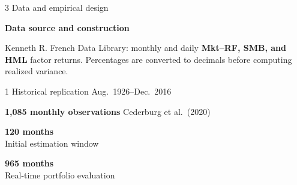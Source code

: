 \documentclass[aspectratio=169,10pt]{beamer}
\newcommand{\micro}[1]{{\color{forest}\bfseries\small #1}}
\begin{document}
\begin{frame}{3 \quad Data and empirical design}



\micro{Data source and construction}

\vspace{.04cm}

{\small
Kenneth R. French Data Library:
monthly and daily \textbf{Mkt--RF, SMB, and HML}
factor returns. Percentages are converted to decimals
before computing realized variance.
}

\vspace{.04cm}


\begin{block}{
  1 \quad Historical replication
  \hfill
  \small Aug.\ 1926--Dec.\ 2016
}

\small
\textbf{1,085 monthly observations}
\hfill
{\scriptsize Cederburg et al.\ (2020)}

\vspace{.04cm}


\vspace{.04cm}

\begin{minipage}[t]{.35\linewidth}
{\scriptsize
\textbf{120 months}\\
Initial estimation window
}
\end{minipage}
\hfill
\begin{minipage}[t]{.60\linewidth}
\raggedleft
{\scriptsize
\textbf{965 months}\\
Real-time portfolio evaluation
}
\end{minipage}

\end{block}


\end{frame}
\end{document}
